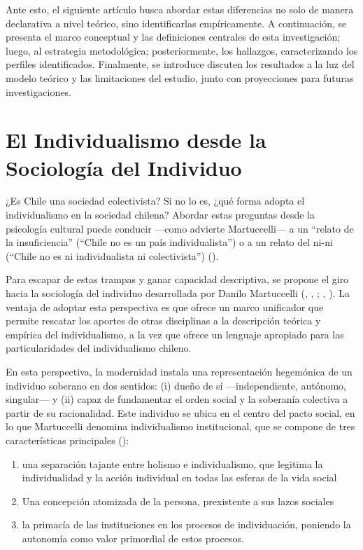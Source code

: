 \documentclass[
  letterpaper,
  DIV=11,
  numbers=noendperiod]{scrartcl}
\begin{document}
Ante esto, el siguiente artículo busca abordar estas diferencias no solo
de manera declarativa a nivel teórico, sino identificarlas
empíricamente. A continuación, se presenta el marco conceptual y las
definiciones centrales de esta investigación; luego, al estrategia
metodológica; posteriormente, los hallazgos, caracterizando los perfiles
identificados. Finalmente, se introduce discuten los resultados a la luz
del modelo teórico y las limitaciones del estudio, junto con
proyecciones para futuras investigaciones.

\section{El Individualismo desde la Sociología del
Individuo}\label{el-individualismo-desde-la-sociologuxeda-del-individuo}

¿Es Chile una sociedad colectivista? Si no lo es, ¿qué forma adopta el
individualismo en la sociedad chilena? Abordar estas preguntas desde la
psicología cultural puede conducir ---como advierte Martuccelli--- a un
``relato de la insuficiencia'' (``Chile no es un país individualista'')
o a un relato del ni-ni (``Chile no es ni individualista ni
colectivista'') ().

Para escapar de estas trampas y ganar capacidad descriptiva, se propone
el giro hacia la sociología del individuo desarrollada por Danilo
Martuccelli (,
, ;
,
). La ventaja de adoptar esta
perspectiva es que ofrece un marco unificador que permite rescatar los
aportes de otras disciplinas a la descripción teórica y empírica del
individualismo, a la vez que ofrece un lenguaje apropiado para las
particularidades del individualismo chileno.

En esta perspectiva, la modernidad instala una representación hegemónica
de un individuo soberano en dos sentidos: (i) dueño de sí
---independiente, autónomo, singular--- y (ii) capaz de fundamentar el
orden social y la soberanía colectiva a partir de su racionalidad. Este
individuo se ubica en el centro del pacto social, en lo que Martuccelli
denomina individualismo institucional, que se compone de tres
características principales ():

\begin{enumerate}
\def\labelenumi{\roman{enumi})}
\item
  una separación tajante entre holismo e individualismo, que legitima la
  individualidad y la acción individual en todas las esferas de la vida
  social
\item
  Una concepción atomizada de la persona, prexistente a sus lazos
  sociales
\item
  la primacía de las instituciones en los procesos de individuación,
  poniendo la autonomía como valor primordial de estos procesos.
\end{enumerate}
\end{document}
